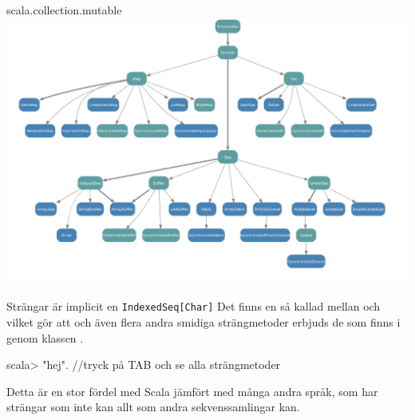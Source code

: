 \begin{Slide}{scala.collection.mutable}
\includegraphics[width=1.05\textwidth]{../img/collection/collection-mutable}
\end{Slide}


\begin{Slide}{Strängar är implicit en \texttt{IndexedSeq[Char]}}\SlideFontSmall
Det finns en så kallad  mellan  och  vilket gör att  och även flera andra smidiga strängmetoder erbjuds  de som finns i \href{http://docs.oracle.com/javase/8/docs/api/java/lang/String.html}{} genom klassen \href{http://www.scala-lang.org/api/current/#scala.collection.immutable.StringOps}{}.

\vspace{0.5em}
\begin{REPLnonum}
scala> "hej".  //tryck på TAB och se alla strängmetoder
\end{REPLnonum}
Detta är en stor fördel med Scala jämfört med många andra språk, som har strängar som inte kan allt som andra sekvenssamlingar kan.
\end{Slide}


